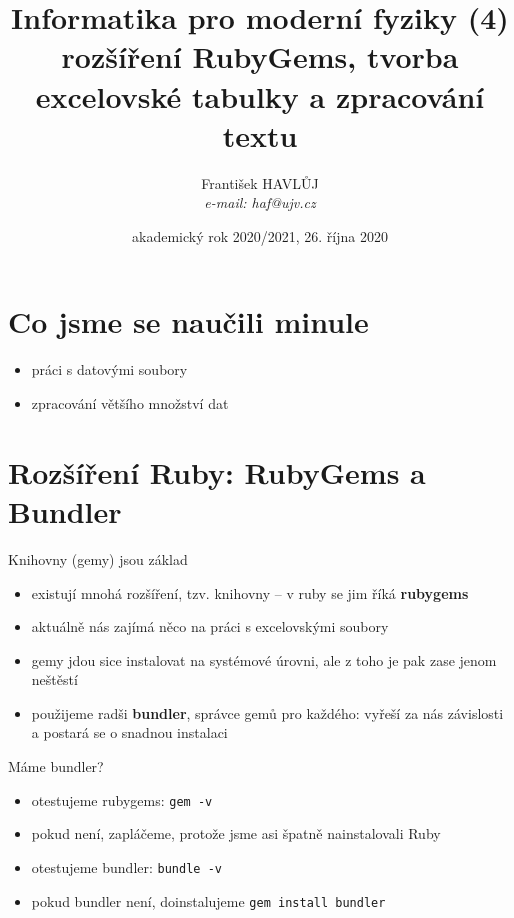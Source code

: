 \documentclass{beamer}
\title[IMF (4)]{Informatika pro moderní fyziky (4)\\rozšíření RubyGems, tvorba excelovské tabulky a zpracování textu}
\author[Franti\v{s}ek HAVL\r{U}J, ORF ÚJV Řež]{Franti\v{s}ek HAVL\r{U}J\\{\scriptsize \emph{e-mail: haf@ujv.cz}}}
\date{akademický rok 2020/2021, 26. října 2020}
\institute[ORF ÚJV Řež]
{ÚJV Řež\\oddělení Reaktorové fyziky a podpory palivového cyklu}
\begin{document}
\begin{frame}
  \titlepage
\end{frame}

\begin{frame}
  \tableofcontents
\end{frame}

\section{Co jsme se naučili minule}

\begin{frame}{}
  \begin{itemize}
    \item práci s datovými soubory
    \item zpracování většího množství dat
  \end{itemize}
\end{frame}

\section{Rozšíření Ruby: RubyGems a Bundler}

\begin{frame}{Knihovny (gemy) jsou základ}
  \begin{itemize}
    \item existují mnohá rozšíření, tzv. knihovny -- v ruby se jim říká \textbf{rubygems}
    \item aktuálně nás zajímá něco na práci s excelovskými soubory
    \item gemy jdou sice instalovat na systémové úrovni, ale z toho je pak zase jenom neštěstí
    \item použijeme radši \textbf{bundler}, správce gemů pro každého: vyřeší za nás závislosti a postará se o snadnou instalaci
  \end{itemize}
\end{frame}

\begin{frame}{Máme bundler?}
  \begin{itemize}
    \item otestujeme rubygems: \texttt{gem -v}
    \item pokud není, zapláčeme, protože jsme asi špatně nainstalovali Ruby
    \item otestujeme bundler: \texttt{bundle -v}
    \item pokud bundler není, doinstalujeme \texttt{gem install bundler}
  \end{itemize}
\end{frame}
\end{document}
